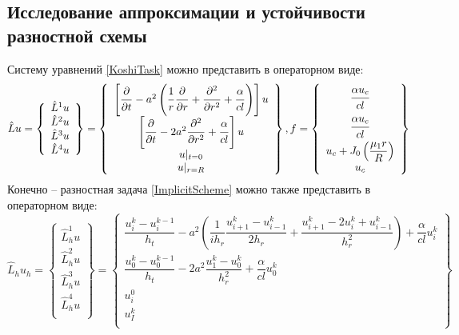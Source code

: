 \documentclass[a4paper,12pt,russian, fleqn]{extreport}
\begin{document}
	\subsection{Исследование аппроксимации и устойчивости разностной схемы}
	Систему уравнений \eqref{KoshiTask} можно представить в операторном виде:
	\begin{equation}\label{OperatorViewKoshiTask}
 	\hat{L}u = \left\{\begin{array}{l}
 		\hat{L}^1u \\
 		\hat{L}^2u \\
 		\hat{L}^3u \\
 		\hat{L}^4u \\
 	\end{array}
 	\right\} = \left\{\begin{array}{c}
 		\left[\dfrac{\strut\partial}{\strut\partial t} - a^2\left( \dfrac{\strut 1}{\strut r}\dfrac{\strut \partial }{\strut \partial r} + \dfrac{\strut \partial^2}{\strut \partial r^2} + \dfrac{\strut \alpha}{\strut cl} \right)\right]u \\
 		\left[\dfrac{\strut \partial }{\strut \partial t} - 2a^2\dfrac{\strut\partial^2}{\strut\partial r^2} + \dfrac{\strut\alpha}{\strut cl}\right]u\\
 		u\vert_{t=0} \\
 		u\vert_{r=R} \\
 	\end{array}\right\}, f = \left\{\begin{array}{c}
 		\dfrac{\strut \alpha u_c}{\strut cl} \\
 		\dfrac{\strut \alpha u_c}{\strut cl} \\
 		u_c + J_0\left(\dfrac{\mu_1 r}{R}\right) \\
 		u_c
 	\end{array}\right\}
	\end{equation}
 	Конечно -- разностная задача \eqref{ImplicitScheme} можно также представить в операторном виде:
 	\begin{equation}\label{OperatorViewImplicitScheme}
 	\hat{L}_hu_h = \left\{\begin{array}{l}
 	\hat{L}_h^1u \\
 	\hat{L}_h^2u \\
 	\hat{L}_h^3u \\
 	\hat{L}_h^4u \\
 	\end{array}
 	\right\} = \left\{\begin{array}{c}
 	\dfrac{u_i^{k}-u_i^{k-1}}{h_t} - a^2\left(\dfrac{1}{ih_r}\dfrac{u_{i+1}^k - u_{i-1}^k}{2h_r} +\dfrac{u_{i+1}^k - 2u_i^k + u_{i-1}^k}{h^2_r}\right) + \dfrac{\alpha}{cl}u_i^k \\
 	\dfrac{u_0^{k}-u_0^{k-1}}{h_t} - 2a^2\dfrac{u_1^k-u_0^k}{h_r^2} + \dfrac{\alpha}{cl}u_0^k\\
 	u_i^0 \\
 	u_I^k \\
 	\end{array}\right\}
 	\end{equation}
\end{document}
